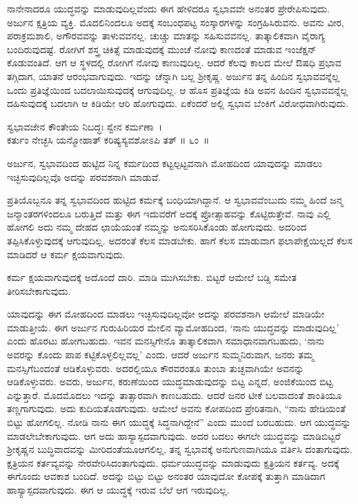 ನಾನೇನಾದರೂ ಯುದ್ಧವನ್ನು ಮಾಡುವುದಿಲ್ಲವೆಂದು ಈಗ ಹೇಳಿದರೂ ಸ್ವಭಾವವೇ ಅನಂತರ ಪ್ರೇರೇಪಿಸುವುದು. ಅರ್ಜುನ ಕ್ಷತ್ರಿಯ ವ್ಯಕ್ತಿ. ಮೊದಲಿನಿಂದಲೂ ಅದಕ್ಕೆ ಸಂಬಂಧಪಟ್ಟ ಸಂಸ್ಕಾರಗಳನ್ನು ಸಂಗ್ರಹಿಸಿರುವನು. ಅವನು ವೀರ, ಪರಾಕ್ರಮಶಾಲಿ, ಅಗೌರವವನ್ನು ತಾಳುವವನಲ್ಲ. ಚುಚ್ಚು ಮಾತನ್ನು ಸಹಿಸುವವನಲ್ಲ. ತಾತ್ಕಾಲಿಕವಾಗಿ ವೈರಾಗ್ಯ ಬಂದಿರುವುದಷ್ಟೆ. ರೋಗಿಗೆ ಶಸ್ತ್ರ ಚಿಕಿತ್ಸೆ ಮಾಡುವುದಕ್ಕೆ ಮುಂಚೆ ನೋವು ಕಾಣದಂತೆ ಮಾಡುವ ಇಂಜೆಕ್ಷನ್ ಕೊಡುವಂತಿದೆ. ಆಗ ಆ ಸ್ಥಳದಲ್ಲಿ ರೋಗಿಗೆ ನೋವು ಕಾಣುವುದಿಲ್ಲ. ಆದರೆ ಕೆಲವು ಕಾಲದ ಮೇಲೆ ಔಷಧಿ ಪ್ರಭಾವ ತಗ್ಗಿದಾಗ, ಯಾತನೆ ಆರಂಭವಾಗುವುದು. ಇದನ್ನು ಚೆನ್ನಾಗಿ ಬಲ್ಲ ಶ‍್ರೀಕೃಷ್ಣ. ಅರ್ಜುನ ತನ್ನ ಹಿಂದಿನ ಸ್ವಭಾವವನ್ನೆಲ್ಲ ಒಂದು ಪ್ರತಿಜ್ಞೆಯಿಂದ ಬದಲಾಯಿಸುವುದಕ್ಕೆ ಆಗುವುದಿಲ್ಲ. ಆ ಹೊಸ ಪ್ರತಿಜ್ಞೆಯ ಕಿಡಿ ಅವನ ಹಿಂದಿನ ಸ್ವಭಾವವನ್ನೆಲ್ಲ ದಹಿಸುವುದಕ್ಕೆ ಬದಲಾಗಿ ಆ ಕಿಡಿಯೇ ಆರಿ ಹೋಗುವುದು. ಏಕೆಂದರೆ ಅಲ್ಲಿ ಸ್ವಭಾವ ಬೆಂಕಿಗೆ ವಿರೋಧವಾಗಿರುವುದು.

\begin{shloka}
ಸ್ವಭಾವಜೇನ ಕೌಂತೇಯ ನಿಬದ್ಧಃ ಸ್ವೇನ ಕರ್ಮಣಾ~।\\ಕರ್ತುಂ ನೇಚ್ಛಸಿ ಯನ್ಮೋಹಾತ್ ಕರಿಷ್ಯಸ್ಯವಶೋಽಪಿ ತತ್ \hfill॥ ೬ಂ~॥
\end{shloka}

\begin{artha}
ಅರ್ಜುನ, ಸ್ವಭಾವದಿಂದ ಹುಟ್ಟಿದ ನಿನ್ನ ಕರ್ಮದಿಂದ ಕಟ್ಟಲ್ಪಟ್ಟವನಾಗಿ ಮೋಹದಿಂದ ಯಾವು\-ದನ್ನು ಮಾಡಲು ಇಚ್ಛಿಸುವುದಿಲ್ಲವೊ ಅದನ್ನು ಪರವಶನಾಗಿ ಮಾಡುವೆ.
\end{artha}

ಪ್ರತಿಯೊಬ್ಬನೂ ತನ್ನ ಸ್ವಭಾವದಿಂದ ಹುಟ್ಟಿದ ಕರ್ಮಕ್ಕೆ ಬಂಧಿಯಾಗಿದ್ದಾನೆ. ಆ ಸ್ವಭಾವ\-ವೆಂಬುದು ನಮ್ಮ ಹಿಂದೆ ಜನ್ಮ ಜನ್ಮಾಂತರಗಳಿಂದಲೂ ಬರುತ್ತಿದೆ ಮತ್ತು ಈಗ ಇದುವರೆಗೆ ಅದಕ್ಕೆ ಪ್ರೋತ್ಸಾಹವನ್ನು ಕೊಟ್ಟಿರುತ್ತೇವೆ. ನಾವು ಎಲ್ಲಿ ಹೋಗಲಿ ಅದು ನಮ್ಮ ದೇಹದ ಛಾಯೆಯಂತೆ ನಮ್ಮನ್ನು ಅನುಸರಿಸಿಕೊಂಡು ಹೋಗುವುದು. ಅದರಿಂದ ತಪ್ಪಿಸಿಕೊಳ್ಳುವುದಕ್ಕೆ ಆಗುವುದಿಲ್ಲ. ಅದರಂತೆ ಕೆಲಸ ಮಾಡಬೇಕು. ಹಾಗೆ ಕೆಲಸ ಮಾಡುವಾಗ ಫಲಾಪೇಕ್ಷೆಯಿಲ್ಲದೆ ಕೆಲಸ ಮಾಡಿದರೆ ಆ ಕರ್ಮ ಕ್ಷಯವಾಗುವುದು.

ಕರ್ಮ ಕ್ಷಯವಾಗುವುದಕ್ಕೆ ಅದೊಂದೆ ದಾರಿ. ಮಾಡಿ ಮುಗಿಸಬೇಕು. ಬಿಟ್ಟರೆ ಆಮೇಲೆ ಬಡ್ಡಿ ಸಮೇತ ತೀರಿಸಬೇಕಾಗುವುದು.

ಯಾವುದನ್ನು ಈಗ ಮೋಹದಿಂದ ಮಾಡಲು ಇಚ್ಛಿಸುವುದಿಲ್ಲವೋ ಅದನ್ನು ಪರವಶನಾಗಿ ಆಮೇಲೆ ಮಾಡಿಯೇ ಮಾಡುತ್ತೀಯೆ. ಈಗ ಅರ್ಜುನ ಗುರುಹಿರಿಯರ ಮೇಲಿನ ವ್ಯಾಮೋಹದಿಂದ, ‘ನಾನು ಯುದ್ಧವನ್ನು ಮಾಡುವುದಿಲ್ಲ’ ಎಂದು ಹೊರಟು ಹೋಗಬಹುದು. ಇವನ ಮನಸ್ಸಿಗೇನೊ ತಾತ್ಕಾಲಿಕವಾಗಿ ಸಮಾಧಾನವಾಗಬಹುದು, ‘ನಾನು ಅವರನ್ನು ಕೊಂದು ಪಾಪ ಕಟ್ಟಿಕೊಳ್ಳಲಿಲ್ಲವಲ್ಲ’ ಎಂದು. ಆದರೆ ಅರ್ಜುನ ಸುಮ್ಮನಿರುವಾಗ, ಜನರು ತಮ್ಮ ಮನಸ್ಸಿಗೆ\break ಬಂದಂತೆ ಆಡಿಕೊಳ್ಳುವರು. ಅದರಲ್ಲಿಯೂ ಕೌರವರಂತೂ ತುಂಬಾ ತುಚ್ಛವಾಗಿಯೇ ಅವನನ್ನು ಆಡಿಕೊಳ್ಳುವರು. ಅವರು, ಅರ್ಜುನ, ಕರುಣೆಯಿಂದ ಯುದ್ಧಮಾಡುವುದನ್ನು ಬಿಟ್ಟ ಎನ್ನದೆ, ಅಂಜಿಕೆಯಿಂದ ಬಿಟ್ಟ ಎನ್ನುತ್ತಾರೆ. ಮೊದಮೊದಲು ಇದನ್ನು ತಾತ್ಸಾರವಾಗಿ ಕಾಣಬಹುದು. ಆದರೆ ಜನರ ಟೀಕೆ ಬಲವಾದಂತೆ ಶಾಂತಿಯೂ ತಣ್ಣಗಾಗುವುದು. ಅದು ಕುದಿಯತೊಡಗುವುದು. ಆಮೇಲೆ ಅವನು ಕೋಪದಿಂದ ಪ್ರೇರಿತನಾಗಿ, “ನಾನು ಹೇಡಿಯಂತೆ ಬಿಟ್ಟು ಹೋಗಲಿಲ್ಲ. ನೋಡಿ ನಾನು ಈಗ ಯುದ್ಧಕ್ಕೆ ಸಿದ್ಧನಾಗಿದ್ದೇನೆ” ಎಂದು ಮುಂದೆ ಬರಬಹುದು. ಆಗ ಯುದ್ಧವನ್ನು ಮಾಡಲೇಬೇಕಾಗುವುದು. ಆಗ ಅದು ಹಾಸ್ಯಾಸ್ಪದವಾಗುವುದು. ಅದರ ಬದಲು ಈಗಲೇ ಯುದ್ಧವನ್ನು ಮಾಡಿಬಿಟ್ಟರೆ ಶ‍್ರೀಕೃಷ್ಣನ ಬುದ್ಧಿವಾದವನ್ನು ಮೀರಿದಂತೆಯೂ\break ಆಗಲಿಲ್ಲ, ತನ್ನ ಸ್ವಭಾವಕ್ಕೆ ಅನುಗುಣವಾಗಿಯೂ ವರ್ತಿಸಿ ದಂತಾಗುವುದು. ಕ್ಷತ್ರಿಯನ ಕರ್ತವ್ಯವನ್ನು ನೇರವೇರಿಸಿದಂತಾಗುವುದು. ಧರ್ಮಯುದ್ಧವನ್ನು ಮಾಡುವುದು ಕ್ಷತ್ರಿಯನ ಕರ್ತವ್ಯ. ಅದಕ್ಕೆ ಈಗೊಂದು ಆವಕಾಶ ಬಂದಿದೆ. ಅದನ್ನು ಬಿಟ್ಟು ಬಿಟ್ಟು ಅನಂತರ ಯಾವುದೋ ಕೋಪಕ್ಕೆ ತುತ್ತಾಗಿ ಮಾಡಿದಾಗ ಹಾಸ್ಯಾಸ್ಪದವಾಗುವುದು. ಈಗ ಆ ಯುದ್ಧಕ್ಕೆ ಇರುವ ಬೆಲೆ ಆಗ ಇರುವುದಿಲ್ಲ.

